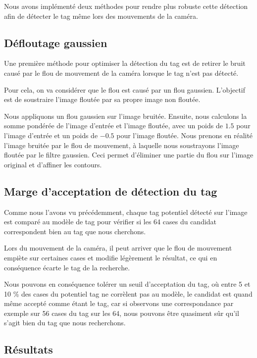     Nous avons implémenté deux méthodes pour rendre plus robuste cette détection afin de détecter le tag même lors des mouvements de la caméra.

        \subsection{Défloutage gaussien}

        Une première méthode pour optimiser la détection du tag est de retirer le bruit causé par le flou de mouvement de la caméra lorsque le tag n'est pas détecté.

        Pour cela, on va considérer que le flou est causé par un flou gaussien. L'objectif est de soustraire l'image floutée par sa propre image non floutée.

        Nous appliquons un flou gaussien sur l'image bruitée. Ensuite, nous calculons la somme pondérée de l'image d'entrée et l'image floutée, avec un poids de $1.5$ pour l'image d'entrée et un poids de $-0.5$ pour l'image floutée. Nous prenons en réalité l'image bruitée par le flou de mouvement, à laquelle nous soustrayons l'image floutée par le filtre gaussien. Ceci permet d'éliminer une partie du flou sur l'image original et d'affiner les contours.

        \subsection{Marge d'acceptation de détection du tag}

        Comme nous l'avons vu précédemment, chaque tag potentiel détecté sur l'image est comparé au modèle de tag pour vérifier si les 64 cases du candidat correspondent bien au tag que nous cherchons.

        Lors du mouvement de la caméra, il peut arriver que le flou de mouvement empiète sur certaines cases et modifie légèrement le résultat, ce qui en conséquence écarte le tag de la recherche.

        Nous pouvons en conséquence tolérer un seuil d'acceptation du tag, où entre 5 et 10 \% des cases du potentiel tag ne corrèlent pas au modèle, le candidat est quand même accepté comme étant le tag, car si observons une correspondance par exemple sur 56 cases du tag sur les 64, nous pouvons être quasiment sûr qu'il s'agit bien du tag que nous recherchons.

        \subsection{Résultats}

